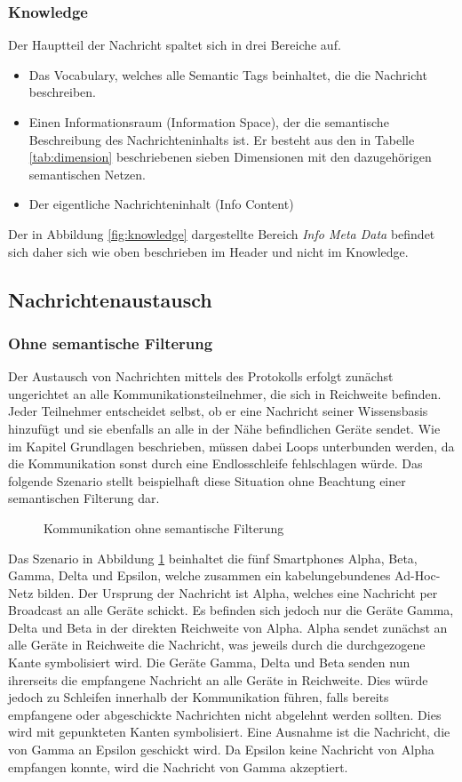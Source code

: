 \subsubsection{Knowledge}
Der Hauptteil der Nachricht spaltet sich in drei Bereiche auf.
\begin{itemize}
	\item Das Vocabulary, welches alle Semantic Tags beinhaltet, die die Nachricht beschreiben.
	\item Einen Informationsraum (Information Space), der die semantische Beschreibung des Nachrichteninhalts ist. Er besteht aus den in Tabelle \ref{tab:dimension} beschriebenen sieben Dimensionen mit den dazugehörigen semantischen Netzen.
	\item Der eigentliche Nachrichteninhalt (Info Content)	
\end{itemize}
Der in Abbildung \ref{fig:knowledge} dargestellte Bereich \textit{Info Meta Data} befindet sich daher sich wie oben beschrieben im Header und nicht im Knowledge.
\subsection{Nachrichtenaustausch}
\subsubsection{Ohne semantische Filterung}
Der Austausch von Nachrichten mittels des Protokolls erfolgt zunächst ungerichtet an alle Kommunikationsteilnehmer, die sich in Reichweite befinden. Jeder Teilnehmer entscheidet selbst, ob er eine Nachricht seiner Wissensbasis hinzufügt und sie ebenfalls an alle in der Nähe befindlichen Geräte sendet. Wie im Kapitel Grundlagen beschrieben, müssen dabei Loops unterbunden werden, da die Kommunikation sonst durch eine Endlosschleife fehlschlagen würde. Das folgende Szenario stellt beispielhaft diese Situation ohne Beachtung einer semantischen  Filterung dar.
\vspace*{-2em}
\begin{figure}[H]
	\centering
	\caption{Kommunikation ohne semantische Filterung}
	\label{fig:beispielszenario}
\end{figure}
Das Szenario in Abbildung \ref{fig:beispielszenario} beinhaltet die fünf Smartphones Alpha, Beta, Gamma, Delta und Epsilon, welche zusammen ein kabelungebundenes Ad-Hoc-Netz bilden. Der Ursprung der Nachricht ist Alpha, welches eine Nachricht per Broadcast an alle Geräte schickt. Es befinden sich jedoch nur die Geräte Gamma, Delta und Beta in der direkten Reichweite von Alpha. Alpha sendet zunächst an alle Geräte in Reichweite die Nachricht, was jeweils durch die durchgezogene Kante symbolisiert wird. Die Geräte Gamma, Delta und Beta senden nun ihrerseits die empfangene Nachricht an alle Geräte in Reichweite. Dies würde jedoch zu Schleifen innerhalb der Kommunikation führen, falls bereits empfangene oder abgeschickte Nachrichten nicht abgelehnt werden sollten. Dies wird mit gepunkteten Kanten symbolisiert. Eine Ausnahme ist die Nachricht, die von Gamma an Epsilon geschickt wird. Da Epsilon keine Nachricht von Alpha empfangen konnte, wird die Nachricht von Gamma akzeptiert. 
